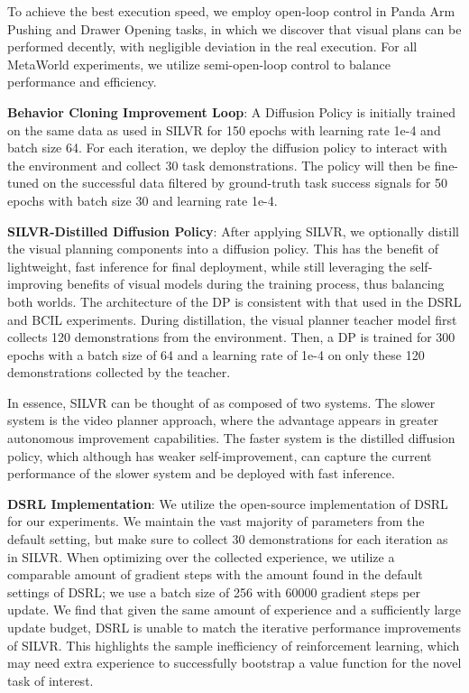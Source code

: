 To achieve the best execution speed, we employ open-loop control in Panda Arm Pushing and Drawer Opening tasks, in which we discover that visual plans can be performed decently, with negligible deviation in the real execution. For all MetaWorld experiments, we utilize semi-open-loop control to balance performance and efficiency.


\textbf{Behavior Cloning Improvement Loop}: A Diffusion Policy is initially trained on the same data as used in SILVR for 150 epochs with learning rate 1e-4 and batch size 64. For each iteration, we deploy the diffusion policy to interact with the environment and collect 30 task demonstrations. The policy will then be fine-tuned on the successful data filtered by ground-truth task success signals for 50 epochs with batch size 30 and learning rate 1e-4. 

\textbf{SILVR-Distilled Diffusion Policy}: After applying SILVR, we optionally distill the visual planning components into a diffusion policy.  This has the benefit of lightweight, fast inference for final deployment, while still leveraging the self-improving benefits of visual models during the training process, thus balancing both worlds.  The architecture of the DP is consistent with that used in the DSRL and BCIL experiments.  During distillation, the visual planner teacher model first collects 120 demonstrations from the environment.  Then, a DP is trained for 300 epochs with a batch size of 64 and a learning rate of 1e-4 on only these 120 demonstrations collected by the teacher.

In essence, SILVR can be thought of as composed of two systems.  The slower system is the video planner approach, where the advantage appears in greater autonomous improvement capabilities.  The faster system is the distilled diffusion policy, which although has weaker self-improvement, can capture the current performance of the slower system and be deployed with fast inference.

\textbf{DSRL Implementation}: We utilize the open-source implementation of DSRL~\citep{wagenmaker2025steering} for our experiments.  We maintain the vast majority of parameters from the default setting, but make sure to collect 30 demonstrations for each iteration as in SILVR. When optimizing over the collected experience, we utilize a comparable amount of gradient steps with the amount found in the default settings of DSRL; we use a batch size of 256 with 60000 gradient steps per update.  We find that given the same amount of experience and a sufficiently large update budget, DSRL is unable to match the iterative performance improvements of SILVR.  This highlights the sample inefficiency of reinforcement learning, which may need extra experience to successfully bootstrap a value function for the novel task of interest.

